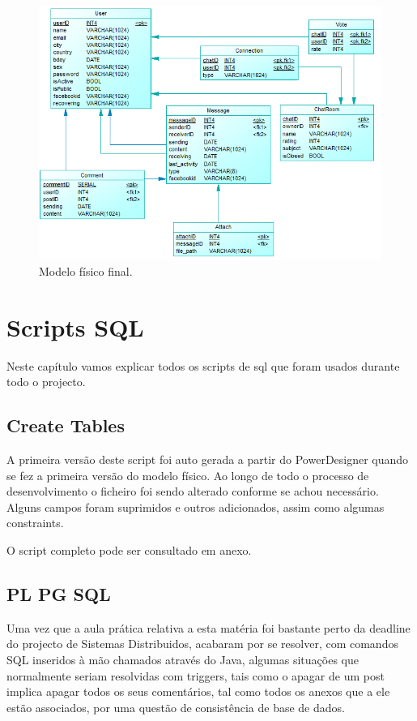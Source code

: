 \documentclass[a4paper, 12pt]{article}
\begin{document}
\begin{figure}[h]
	\includegraphics[keepaspectratio=true, height=0.43\textheight]{physical}
	\caption{Modelo físico final.}
\end{figure}
\cleardoublepage


\section{Scripts SQL}
\indent \indent Neste capítulo vamos explicar todos os scripts de sql que foram usados durante todo o projecto.

\subsection{Create Tables}
\indent \indent A primeira versão deste script foi auto gerada a partir do PowerDesigner quando se fez a primeira versão do modelo físico. Ao longo de todo o processo de desenvolvimento o ficheiro foi sendo alterado conforme se achou necessário. Alguns campos foram suprimidos e outros adicionados, assim como algumas constraints.

O script completo pode ser consultado em anexo.

\subsection{PL PG SQL}
\indent \indent Uma vez que a aula prática relativa a esta matéria foi bastante perto da deadline do projecto de Sistemas Distribuidos, acabaram por se resolver, com comandos SQL inseridos à mão chamados através do Java, algumas situações que normalmente seriam resolvidas com triggers, tais como o apagar de um post implica apagar todos os seus comentários, tal como todos os anexos que a ele estão associados, por uma questão de consistência de base de dados.
\end{document}
